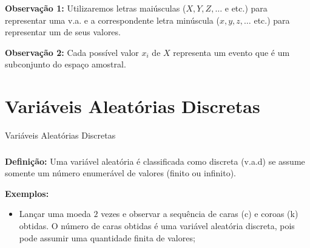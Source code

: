 \documentclass[14pt,aspectratio=1610]{beamer}
\begin{document}
\begin{frame}{}
\frametitle{}
\begin{block}{}
\justifying
\textbf{Observação 1:} \justifying Utilizaremos letras maiúsculas ($X,Y, Z,\ldots $ e etc.) para representar uma v.a. e a correspondente letra minúscula ($x,y,z,\ldots$ etc.) para 
representar um de seus valores.

\textbf{Observação 2:} \justifying Cada possível valor $x_{i}$ de $X$ representa um evento que é um subconjunto do espaço amostral.
\end{block}
\end{frame}

\begin{frame}{}
\frametitle{}
\begin{block}{}
\justifying
{}
\end{block}
\end{frame}

\section{Variáveis Aleatórias Discretas}
\begin{frame}{Variáveis Aleatórias Discretas}
\frametitle{}
\begin{block}{}
\justifying
\textbf{Definição:} Uma variável aleatória é classificada como discreta (v.a.d) se assume somente um número enumerável de valores (finito ou infinito).

\textbf{Exemplos:}

\begin{itemize}
\item \justifying Lançar uma moeda $2$ vezes e observar a sequência de caras (c) e coroas (k) obtidas. O número de caras obtidas é uma variável aleatória dis\-cre\-ta, pois pode assumir uma quantidade finita de valores;
\end{itemize}
\end{block}
\end{frame}
\end{document}
